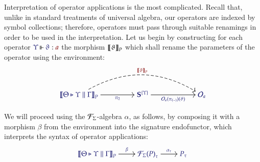 Interpretation of operator applications is the most complicated. Recall that,
unlike in standard treatments of universal algebra, our operators are indexed by
symbol collections; therefore, operators must pass through suitable renamings in
order to be used in the interpretation. Let us begin by constructing for each
operator $\IsOperator{\Upsilon}{\vartheta}{a}$ the morphism
$\left\llbracket\vartheta\right\rrbracket_P$ which shall rename the parameters of the operator
using the environment:
\[
  \begin{tikzcd}[cramped, ampersand replacement = \&, sep = huge]
    |[alias = Src]|
    {\IMode{
      {\SemBrackets{
        \Theta\triangleright\Upsilon\parallel\Gamma
      }}_{P}
    }}
      \arrow[
        , r
        , swap
        , "\IMode{\pi_2}"
      ]
\&
    {\IMode{\SymPsh^{\{\Upsilon\}}}}
      \arrow[
        , r
        , swap
        , "\IMode{\Operators_a(\pi_{(-)})(\vartheta)}"
      ]
\&[1.5em]
    |[alias = Tgt]|
    {\IMode{\Operators_a}}
      \arrow[
        , from = Src
        , to = Tgt
        , bend left
        , dashed
        , "\OMode{\SemBrackets{\vartheta}_{P}}"
      ]
  \end{tikzcd}
\]

We will proceed using the $\mathcal{F}_{\Sigma}$-algebra $\alpha$, as
follows, by composing it with a morphism $\beta$ from the environment into
the signature endofunctor, which interprets the syntax of operator applications:
\[
  \begin{tikzcd}[cramped, ampersand replacement = \&]
    {\IMode{
      {\SemBrackets{\Theta\triangleright\Upsilon\parallel\Gamma}}_{P}
    }}
      \arrow[r, "\IMode{\beta}"]
\&
    {\IMode{
      {\SigFun{\Sigma}(P)}_{\tau}
    }}
      \arrow[r, "\IMode{\alpha_\tau}"]
\&
    {\IMode{P_\tau}}
  \end{tikzcd}
\]

